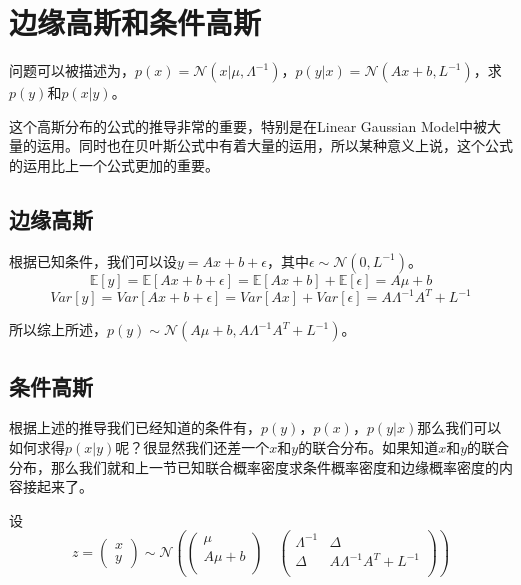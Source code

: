 \documentclass[a4paper]{article}
\begin{document}
\section{边缘高斯和条件高斯}
问题可以被描述为，$p(x)=\mathcal{N}(x|\mu,\Lambda^{-1})$，$p(y|x)=\mathcal{N}(Ax+b,L^{-1})$，求$p(y)$和$p(x|y)$。

这个高斯分布的公式的推导非常的重要，特别是在Linear Gaussian Model中被大量的运用。同时也在贝叶斯公式中有着大量的运用，所以某种意义上说，这个公式的运用比上一个公式更加的重要。

\subsection{边缘高斯}

根据已知条件，我们可以设$y=Ax+b+\epsilon$，其中$\epsilon\sim\mathcal{N}(0,L^{-1})$。
\begin{equation}
    \mathbb{E}[y]=\mathbb{E}[Ax+b+\epsilon] = \mathbb{E}[Ax+b]+ \mathbb{E}[\epsilon] = A\mu +b
\end{equation}
\begin{equation}
    Var[y] = Var[Ax+b+\epsilon] = Var[Ax]+Var[\epsilon]=A\Lambda^{-1}A^T +L^{-1}
\end{equation}

所以综上所述，$p(y)\sim\mathcal{N}(A\mu +b, A\Lambda^{-1}A^T +L^{-1})$。

\subsection{条件高斯}
根据上述的推导我们已经知道的条件有，$p(y)$，$p(x)$，$p(y|x)$那么我们可以如何求得$p(x|y)$呢？很显然我们还差一个$x$和$y$的联合分布。如果知道$x$和$y$的联合分布，那么我们就和上一节已知联合概率密度求条件概率密度和边缘概率密度的内容接起来了。

设
\begin{equation}
    z=
    \begin{pmatrix}
        x \\ 
        y
    \end{pmatrix} \sim
    \mathcal{N}
    \left(
    \begin{pmatrix}
        \mu \\
        A\mu + b \\
    \end{pmatrix}
    \quad
    \begin{pmatrix}
        \Lambda^{-1} & \Delta \\
        \Delta   & A\Lambda^{-1}A^T +L^{-1} \\
    \end{pmatrix}
    \right)
\end{equation}
\end{document}
